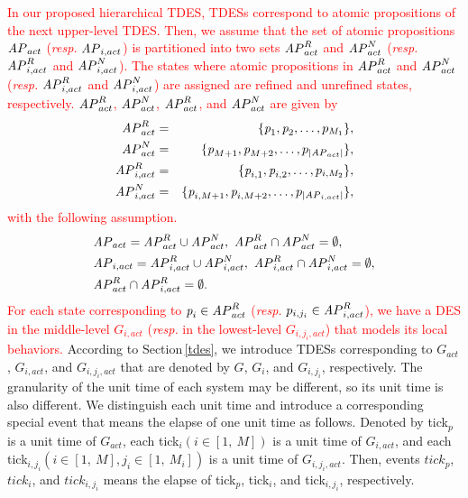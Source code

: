 \documentclass[journal,twoside,web]{IEEEtran}
\newcommand{\rsec}[1]{Section\,\ref{#1}}
\newcommand{\tick}{{\sf tick}}
\newcommand{\AP}{{\textit AP}}
\newcommand{\red}[1]{\textcolor{red}{#1}}
\begin{document}
%
%
\red{
In our proposed hierarchical TDES, TDESs correspond to atomic propositions of the next upper-level TDES.
Then, we assume that the set of atomic propositions $\AP_{act}$ ({\sl resp.} $\AP_{i,act}$) is partitioned into two sets $\AP_{act}^{R}$ and $\AP_{act}^{N}$ ({\sl resp.} $\AP_{i,act}^{R}$ and $\AP_{i,act}^{N}$).
The states where atomic propositions in $\AP_{act}^{R}$ and $\AP_{act}^{N}$ ({\sl resp.} $\AP_{i,act}^{R}$ and $\AP_{i,act}^{N}$) are assigned are refined and unrefined states, respectively.
%
$\AP_{act}^R$, $\AP_{act}^N$, $\AP_{act}^R$, and $\AP_{act}^N$ are given by
\begin{eqnarray}
\AP_{act}^R&=&\{\textit{p}_1,\textit{p}_2,\ldots,p_{M_1}\}, \notag \\
\AP_{act}^N&=&\{\textit{p}_{M+1},\textit{p}_{M+2},\ldots,p_{|\AP_{act}|}\},\notag \\
\AP_{i,act}^R&=&\{\textit{p}_{i,1},\textit{p}_{i,2},\ldots,p_{i,M_2}\}, \notag \\
\AP_{i,act}^N&=&\{\textit{p}_{i,M+1},\textit{p}_{i,M+2},\ldots,p_{|\AP_{i,act}|}\},\notag
\end{eqnarray}
%
with the following assumption.
%
\begin{align}
&\AP_{act}=\AP_{act}^R \cup \AP_{act}^N,~
\AP_{act}^R \cap \AP_{act}^N=\emptyset,\notag\\
&\AP_{i,act}=\AP_{i,act}^R \cup \AP_{i,act}^N,~
\AP_{i,act}^R \cap \AP_{i,act}^N=\emptyset,\notag\\
&\AP_{act}^R \cap \AP_{i,act}^R =\emptyset.\notag
\end{align}
%
For each state corresponding to $\textit{p}_i \in \AP_{act}^{R}$ ({\sl resp.} $p_{i,{j_i}}\in \AP_{i,act}^{R}$), we have a DES in the middle-level $G_{i, act}$ ({\sl resp.} in the lowest-level $G_{i,{j_i}, act}$) that models its local behaviors.}
%
According to \rsec{tdes}, we introduce TDESs corresponding to $G_{act}$, $G_{i,act}$, and $G_{i,{j_i},act}$ that are denoted by $G$, $G_{i}$, and $G_{i,{j_i}}$, respectively.
%
The granularity of the unit time of each system may be different, so its unit time is also different. 
We distinguish each unit time and introduce a corresponding special event that means the elapse of one unit time as follows.
%
Denoted by \tick$_p$ is a unit time of $G_{act}$, each \tick$_i (i\in[1,\ M])$ is a unit time of $G_{i,act}$, and each \tick$_{i,{j_i}} (i\in[1,\ M], j_i\in[1,\ M_i])$ is a unit time of $G_{i,{j_i},act}$. Then,  events $\textit{tick}_p$, $\textit{tick}_i$, and $\textit{tick}_{i,{j_i}}$ means the elapse of \tick$_p$, \tick$_{i}$, and \tick$_{i,{j_i}}$, respectively.
\end{document}

